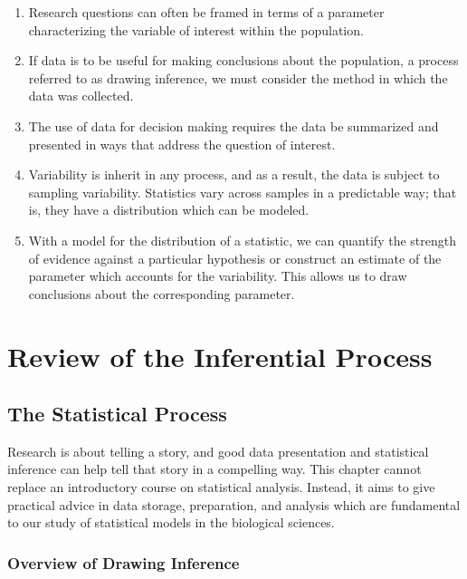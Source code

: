 \documentclass[
]{book}
\theoremstyle{plain}
\theoremstyle{mydefn}
\theoremstyle{myexmpl}
\theoremstyle{remark}
\begin{document}
\begin{enumerate}
\def\labelenumi{\arabic{enumi}.}
\item
  Research questions can often be framed in terms of a parameter characterizing the variable of interest within the population.
\item
  If data is to be useful for making conclusions about the population, a process referred to as drawing inference, we must consider the method in which the data was collected.
\item
  The use of data for decision making requires the data be summarized and presented in ways that address the question of interest.
\item
  Variability is inherit in any process, and as a result, the data is subject to sampling variability. Statistics vary across samples in a predictable way; that is, they have a distribution which can be modeled.
\item
  With a model for the distribution of a statistic, we can quantify the strength of evidence against a particular hypothesis or construct an estimate of the parameter which accounts for the variability. This allows us to draw conclusions about the corresponding parameter.
\end{enumerate}

\hypertarget{part-review-of-the-inferential-process}{%
\part{Review of the Inferential Process}\label{part-review-of-the-inferential-process}}

\hypertarget{statistical-process}{%
\chapter{The Statistical Process}\label{statistical-process}}

Research is about telling a story, and good data presentation and statistical inference can help tell that story in a compelling way. This chapter cannot replace an introductory course on statistical analysis. Instead, it aims to give practical advice in data storage, preparation, and analysis which are fundamental to our study of statistical models in the biological sciences.

\hypertarget{overview-of-drawing-inference}{%
\section{Overview of Drawing Inference}\label{overview-of-drawing-inference}}
\end{document}
